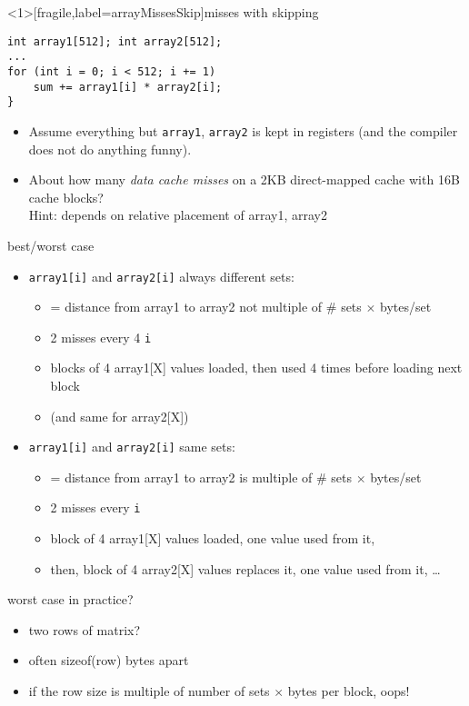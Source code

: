 \begin{frame}<1>[fragile,label=arrayMissesSkip]{misses with skipping}
\begin{lstlisting}
int array1[512]; int array2[512];
...
for (int i = 0; i < 512; i += 1)
    sum += array1[i] * array2[i];
}
\end{lstlisting}
    \begin{itemize}
        \item {\small
    Assume everything but {\tt array1}, {\tt array2} is kept in registers (and the compiler does not do
    anything funny).
        }
    \item
About how many \textit{data cache misses} on a 2KB direct-mapped cache with 16B cache blocks? \\
Hint: depends on relative placement of array1, array2
\end{itemize}
\end{frame}

\begin{frame}{best/worst case}
\begin{itemize}
\item \texttt{array1[i]} and \texttt{array2[i]} always different sets:
    \begin{itemize}
    \item = distance from array1 to array2 not multiple of \# sets $\times$ bytes/set
    \item 2 misses every 4 \texttt{i}
    \item blocks of 4 array1[X] values loaded, then used 4 times before loading next block
    \item (and same for array2[X])
    \end{itemize}
\item \texttt{array1[i]} and \texttt{array2[i]} same sets:
    \begin{itemize}
    \item = distance from array1 to array2 is multiple of \# sets $\times$ bytes/set
    \item 2 misses every \texttt{i}
    \item block of 4 array1[X] values loaded, one value used from it,
    \item then, block of 4 array2[X] values replaces it, one value used from it, \ldots
    \end{itemize}
\end{itemize}
\end{frame}

\begin{frame}{worst case in practice?}
    \begin{itemize}
    \item two rows of matrix?
    \item often sizeof(row) bytes apart
    \item if the row size is multiple of number of sets $\times$ bytes per block, oops!
    \end{itemize}
\end{frame}
